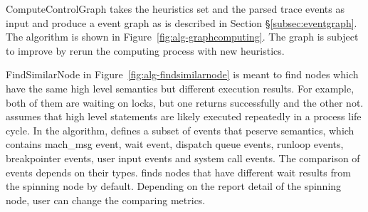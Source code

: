 %	

%

ComputeControlGraph takes the heuristics set and the parsed trace
events as input and produce a event graph as is described in
Section \S\ref{subsec:eventgraph}. The algorithm is shown in
Figure~\ref{fig:alg-graphcomputing}. The graph is subject to improve by rerun
the computing process with new heuristics.

FindSimilarNode in Figure~\ref{fig:alg-findsimilarnode} is meant to find nodes
which have the same high level semantics but different execution results.
For example, both of them are waiting on locks, but one returns successfully and the other not.
\xxx assumes that high level statements are likely executed repeatedly in a process life cycle.
In the algorithm, \xxx defines a subset of
events that peserve semantics, which contains mach\_msg event, wait event,
dispatch queue events, runloop events, breakpointer events, user input events
and system call events.
The comparison of events depends on their types.
\xxx finds nodes that have different wait results from the spinning node by default.
Depending on the report detail of the spinning node, user can
change the comparing metrics.

